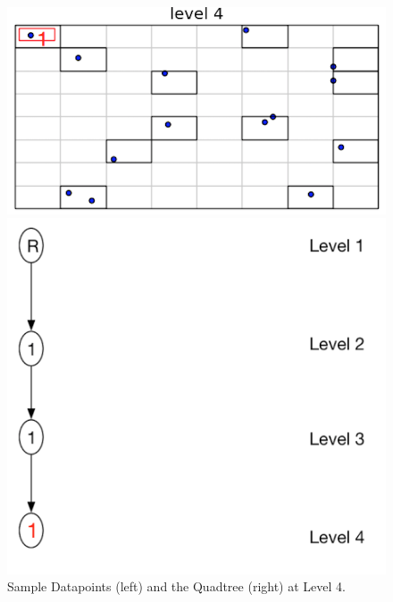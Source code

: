 \begin{figure}[H]
  \centering
  \vspace{0.5in}
  \begin{minipage}[b]{0.35\textwidth}
    \includegraphics[width=\textwidth]{Images/1_1Quad1_4}
  \end{minipage}
  \hfill
  \begin{minipage}[b]{0.5\textwidth}
    \includegraphics[width=\textwidth]{Images/1Quad_4_tree}
  \end{minipage}
  \vspace{0.5in}
  \caption{Sample Datapoints (left) and the Quadtree (right) at Level 4.}
  \label{fig:Level4}
\end{figure}

